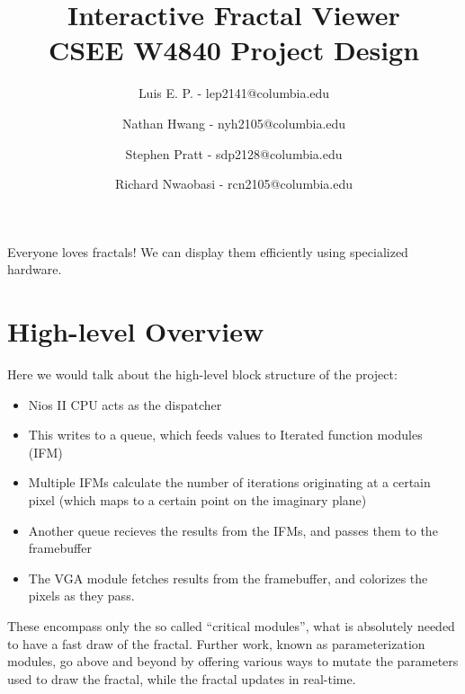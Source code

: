 \documentclass{article}
\begin{document}
\title{Interactive Fractal Viewer \\
CSEE W4840 Project Design}
\author{Luis E. P. - lep2141@columbia.edu \and
Nathan Hwang - nyh2105@columbia.edu \and
Stephen Pratt - sdp2128@columbia.edu \and
Richard Nwaobasi - rcn2105@columbia.edu}
\maketitle



Everyone loves fractals! We can display them efficiently using
specialized hardware. 


\section{High-level Overview}

Here we would talk about the high-level block structure of the project:

\begin{itemize}
\item Nios II CPU acts as the dispatcher
\item This writes to a queue, which feeds values to Iterated function
  modules (IFM)
\item Multiple IFMs calculate the number of iterations originating at
  a certain pixel (which maps to a certain point on the imaginary
  plane)
\item Another queue recieves the results from the IFMs, and passes
  them to the framebuffer
\item The VGA module fetches results from the framebuffer, and
  colorizes the pixels as they pass.
\end{itemize}

These encompass only the so called ``critical modules'', what is
absolutely needed to have a fast draw of the fractal. Further work,
known as parameterization modules, go above and beyond by offering
various ways to mutate the parameters used to draw the fractal, while
the fractal updates in real-time.
\end{document}
